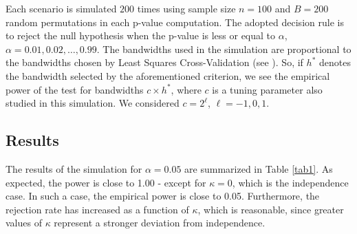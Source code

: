 \documentclass[oneside,11pt]{article}
\begin{document}
Each scenario is simulated $200$ times using sample size $n=100$ and $B=200$ random permutations in each p-value computation. The adopted decision rule is to reject the null hypothesis when the p-value is less or equal to $\alpha$, $\alpha = 0.01, 0.02, \dots, 0.99$. The bandwidths used in the simulation are proportional to the bandwidths chosen by Least Squares Cross-Validation (see \cite{chacon2026blessingdimensionalitycrossvalidatedbandwidth}). So, if $h^*$ denotes the bandwidth selected by the aforementioned criterion, we see the empirical power of the test for bandwidths $c \times h^*$, where $c$ is a tuning parameter also studied in this simulation. We considered $c = 2^\ell$, $\ell = -1, 0, 1$.

\subsection{Results}

The results of the simulation for $\alpha = 0.05$ are summarized in Table \ref{tab1}. As expected, the power is close to 1.00 - except for $\kappa = 0$, which is the independence case. In such a case, the empirical power is close to 0.05. Furthermore, the rejection rate has increased as a function of $\kappa$, which is reasonable, since greater values of $\kappa$ represent a stronger deviation from independence.
\end{document}
